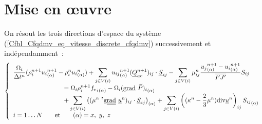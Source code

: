 %
% 
%
% 
% 
% 
%
%

\section{Mise en \oe uvre}
On r\'esout les trois directions d'espace du syst\`eme
(\ref{Cfbl_Cfqdmv_eq_vitesse_discrete_cfqdmv}) successivement et ind\'ependamment~:
\begin{equation}\label{Cfbl_Cfqdmv_eq_vitesse_finale_cfqdmv}
\left\{\begin{array}{l}
\displaystyle\frac{\Omega_i}{\Delta t^n}
(\rho_i^{n+1}{u_i}_{(\alpha)}^{n+1}-\rho_i^n{u_i}_{(\alpha)}^n)
+ \displaystyle\sum\limits_{j\in V(i)}
{u_{ij}}_{(\alpha)}^{n+1}(\vect{Q}_{ac}^{n+1})_{ij}\cdot\vect{S}_{ij}
- \displaystyle\sum\limits_{j\in V(i)}
\mu_{ij}^n\frac{{u_j}_{(\alpha)}^{n+1}-{u_i}_{(\alpha)}^{n+1}}{\overline{I'J'}}S_{ij}\\
\qquad\qquad\qquad\qquad= \Omega_i\rho_i^{n+1} {{f_v}_i}_{(\alpha)}
- \Omega_i{(\gradv{\widetilde{P}})_{i}}_{(\alpha)}\\ 
\qquad\qquad\qquad\qquad + \displaystyle\sum\limits_{j\in V(i)}
\left((\mu^n\ ^t\gradt{\vect{u}^n})_{ij}\cdot\vect{S}_{ij}\right)_{(\alpha)}
 + \displaystyle\sum\limits_{j\in V(i)} \left((\kappa^n-\frac{2}{3}\mu^n)
\divs{\vect{u}^n}\right)_{ij}{S_{ij}}_{(\alpha)}\\
i = 1\ldots N \qquad \text{et} \qquad (\alpha) = x,\ y,\ z\\
\end{array}\right.
\end{equation}

